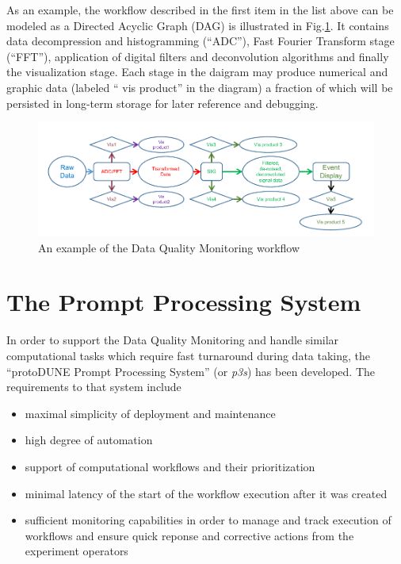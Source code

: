 \documentclass{PoS}
\newcommand{\pd}{protoDUNE\xspace}
\begin{document}
\noindent As an example, the workflow described in the first item in the list above can be modeled as a Directed Acyclic Graph (DAG)
is illustrated in Fig.\ref{fig:dag1}. It contains data decompression and histogramming (``ADC''), Fast Fourier Transform stage (``FFT''),
application of digital filters and deconvolution algorithms and finally the visualization stage. Each stage in the daigram may produce
numerical and graphic data (labeled `` vis product'' in the diagram) a fraction of which will be persisted in long-term storage for
later reference and debugging.

\begin{figure}[tb]
\centering\includegraphics[width=1.0\textwidth]{dag1.pdf}
\caption{\label{fig:dag1}An example of the Data Quality Monitoring workflow}
\end{figure}

\section{The Prompt Processing System}
In order to support the Data Quality Monitoring and handle similar computational tasks which require fast turnaround during data taking,
the ``\pd Prompt Processing System'' (or \textit{p3s}) has been developed. The requirements to that system include
\begin{itemize}
\item maximal simplicity of deployment and maintenance

\item high degree of automation

\item support of computational workflows and their prioritization

\item minimal latency of the start of the workflow execution after it was created

\item sufficient monitoring capabilities in order to manage and track execution of workflows and ensure quick
reponse and corrective actions from the experiment operators
\end{itemize}
\end{document}
